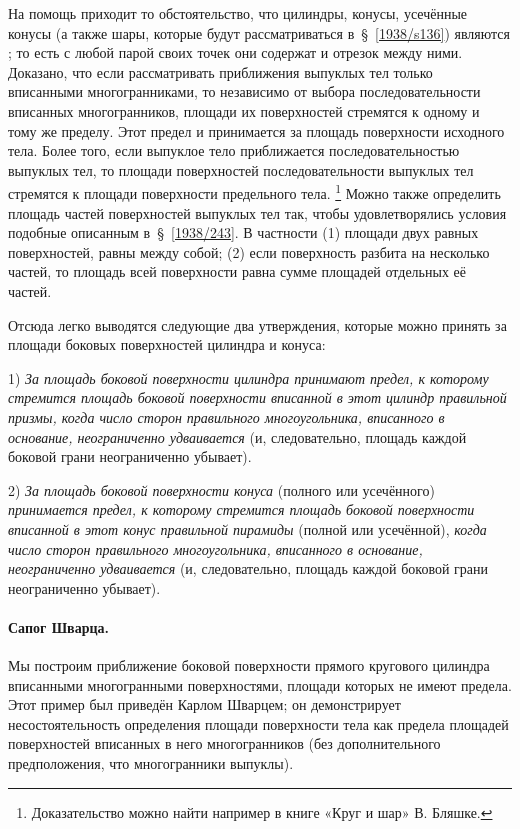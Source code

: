 На помощь приходит то обстоятельство, что цилиндры, конусы, усечённые конусы (а также шары, которые будут рассматриваться в~§~\ref{1938/s136}) являются ; то есть с любой парой своих точек они содержат и отрезок между ними.
Доказано, что если рассматривать приближения выпуклых тел только  вписанными многогранниками, то независимо от выбора последовательности вписанных многогранников, площади их поверхностей стремятся к одному и тому же пределу.
Этот предел и принимается за площадь поверхности исходного тела. 
Более того, если выпуклое тело приближается последовательностью выпуклых тел,
то площади поверхностей последовательности выпуклых тел стремятся к площади поверхности предельного тела.%
\footnote{Доказательство можно найти например в книге «Круг и шар» В. Бляшке.}
Можно также определить площадь частей поверхностей выпуклых тел так, чтобы удовлетворялись условия подобные описанным в~§~\ref{1938/243}.
В частности (1) площади двух равных поверхностей, равны между собой; (2) если поверхность разбита на несколько частей, то  площадь всей поверхности равна сумме площадей отдельных её частей.

Отсюда легко выводятся следующие два утверждения, которые можно принять за  площади боковых поверхностей цилиндра и конуса:

1) \emph{За площадь боковой поверхности цилиндра принимают предел, к которому стремится площадь боковой поверхности вписанной в этот цилиндр правильной призмы, когда число сторон правильного многоугольника, вписанного в основание, неограниченно удваивается} (и, следовательно, площадь каждой боковой грани неограниченно убывает).

2) \emph{За площадь боковой поверхности конуса} (полного или усечённого) \emph{принимается предел, к которому стремится площадь боковой поверхности вписанной в этот конус правильной пирамиды} (полной или усечённой), \emph{когда число сторон правильного многоугольника, вписанного в основание, неограниченно удваивается} (и, следовательно, площадь каждой боковой грани неограниченно убывает).

\paragraph{Сапог Шварца.}\label{fikhtengoltz/3-623b}
Мы построим приближение боковой поверхности прямого кругового цилиндра  вписанными многогранными поверхностями, площади которых не имеют предела.
Этот пример был приведён Карлом Шварцем; он демонстрирует несостоятельность определения площади поверхности тела как предела площадей поверхностей вписанных в него многогранников (без дополнительного предположения, что многогранники выпуклы).

